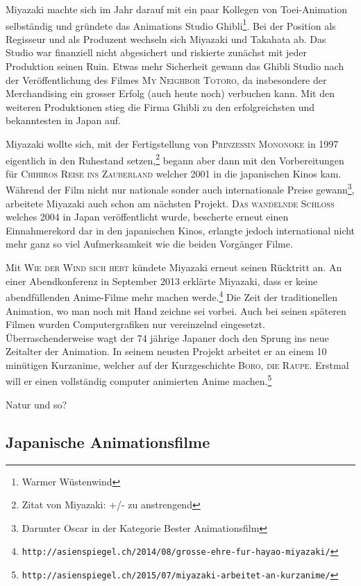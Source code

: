 Miyazaki machte sich im Jahr darauf mit ein paar Kollegen von Toei-Animation selbständig und gründete das Animations Studio Ghibli\footnote{Warmer Wüstenwind}. Bei der Position als Regisseur und als Produzent wechseln sich Miyazaki und Takahata ab. Das Studio war finanziell nicht abgesichert und riskierte zunächst mit jeder Produktion seinen Ruin. Etwas mehr Sicherheit gewann das Ghibli Studio nach der Veröffentlichung des Filmes \textsc{My Neighbor Totoro}, da insbesondere der Merchandising ein grosser Erfolg (auch heute noch) verbuchen kann. Mit den weiteren Produktionen stieg die Firma Ghibli zu den erfolgreichsten und bekanntesten in Japan auf.

Miyazaki wollte sich, mit der Fertigstellung von \textsc{Prinzessin Mononoke} in 1997 eigentlich in den Ruhestand setzen,\footnote{Zitat von Miyazaki: +/- zu anstrengend} begann aber dann mit den Vorbereitungen für \textsc{Chihiros Reise ins Zauberland} welcher 2001 in die japanischen Kinos kam. Während der Film nicht nur nationale sonder auch internationale Preise gewann\footnote{Darunter Oscar in der Kategorie Bester Animationsfilm}, arbeitete Miyazaki auch schon am nächsten Projekt. \textsc{Das wandelnde Schloss} welches 2004 in Japan veröffentlicht wurde, bescherte erneut einen Einnahmerekord dar in den japanischen Kinos, erlangte jedoch international nicht mehr ganz so viel Aufmerksamkeit wie die beiden Vorgänger Filme. 

Mit \textsc{Wie der Wind sich hebt} kündete Miyazaki erneut seinen Rücktritt an. An einer Abendkonferenz in September 2013 erklärte Miyazaki, dass er keine abendfüllenden Anime-Filme mehr machen werde.\footnote{\texttt{http://asienspiegel.ch/2014/08/grosse-ehre-fur-hayao-miyazaki/}} Die Zeit der traditionellen Animation, wo man noch mit Hand zeichne sei vorbei. Auch bei seinen späteren Filmen wurden Computergrafiken nur vereinzelnd eingesetzt. Überraschenderweise wagt der 74 jährige Japaner doch den Sprung ins neue Zeitalter der Animation. In seinem neusten Projekt arbeitet er an einem 10 minütigen Kurzanime, welcher auf der Kurzgeschichte \textsc{Boro, die Raupe}. Erstmal will er einen vollständig computer animierten Anime machen.\footnote{\texttt{http://asienspiegel.ch/2015/07/miyazaki-arbeitet-an-kurzanime/}}

Natur und so?

\subsection{Japanische Animationsfilme}

